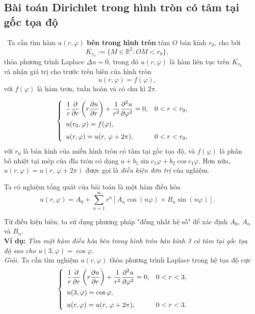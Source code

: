 \documentclass[10pt, a4paper]{article}
\begin{document}
	\subsection{Bài toán Dirichlet trong hình tròn có tâm tại gốc tọa độ}
	\vspace{2mm}
	\quad\,\,\,Ta cần tìm hàm $u(r,\varphi)$ \textbf{bên trong hình tròn} tâm $O$ bán kính $r_0$, cho bởi $$K_{r_0}:=\{M\in\mathbb R^2:OM<r_0\},$$
	thỏa phương trình Laplace $\Delta u=0$, trong đó $u(r,\varphi)$ là hàm liên tục trên $\overline{K_{r_0}}$ và nhận giá trị cho trước
	trên biên của hình tròn $$u(r,\varphi)=f(\varphi),$$
	với $f(\varphi)$ là hàm trơn, tuần hoàn và có chu kì $2\pi$.
	\vspace{2mm}
	\begin{tcolorbox}[enhanced,colback=blue!5!white,colframe=blue!75!black,sharp corners=all,shadow={0mm}{0mm}{-1.5mm}%
		{fill=blue!75!red,opacity=0.3},title=\textbf{Dạng của bài toán}]
		$$\begin{cases}
			\begin{array}{ll}
				\dfrac1r\dfrac{\partial}{\partial r}\left(r\dfrac{\partial u}{\partial r}\right)+\dfrac{1}{r^2}\dfrac{\partial^2u}{\partial\varphi^2}=0, & 0<r<r_0,\\
				\noalign{\vskip3pt}
				u(r_0,\varphi)=f(\varphi),\\
				\noalign{\vskip4pt}
				u(r,\varphi)=u(r,\,\varphi+2\pi), & 0<r<r_0,
			\end{array}
		\end{cases}$$
		với $r_0$ là bán kính của miền hình tròn có tâm tại gốc tọa độ, và $f(\varphi)$ là phân bố nhiệt tại mép của đĩa tròn có dạng $a+b_1\sin c_1\varphi+b_2\cos c_1\varphi$.\vskip7pt
		Hơn nữa, $u(r,\varphi)=u(r,\,\varphi+2\pi)$ được gọi là \textit{điều kiện đơn trị} của nghiệm.
	\end{tcolorbox}
	\vspace{2mm}
	Ta có nghiệm tổng quát của bài toán là một hàm điều hòa $$u(r,\varphi)=A_0+\displaystyle\sum_{n=1}^\infty r^n[A_n\cos(n\varphi)+B_n\sin(n\varphi)].$$
	
	Từ điều kiện biên, ta sử dụng phương pháp "đồng nhất hệ số" để xác định $A_0,\,A_n$ và $B_n$.\\
	
	\textbf{Ví dụ:} \textit{Tìm một hàm điều hòa bên trong hình tròn bán kính 3 có tâm tại gốc tọa độ sao cho $u(3,\varphi)=\cos\varphi$.}\\
	
	\textit{Giải.} Ta cần tìm nghiệm $u(r,\varphi)$ thỏa phương trình Laplace trong hệ tọa độ cực $$\begin{cases}
		\begin{array}{ll}
			\dfrac1r\dfrac{\partial}{\partial r}\left(r\dfrac{\partial u}{\partial r}\right)+\dfrac{1}{r^2}\dfrac{\partial^2u}{\partial\varphi^2}=0, & 0<r<3,\\
			\noalign{\vskip3pt}
			u(3,\varphi)=\cos\varphi,\\
			\noalign{\vskip4pt}
			u(r,\varphi)=u(r,\,\varphi+2\pi), & 0<r<3.
		\end{array}
	\end{cases}$$
	
\end{document}
